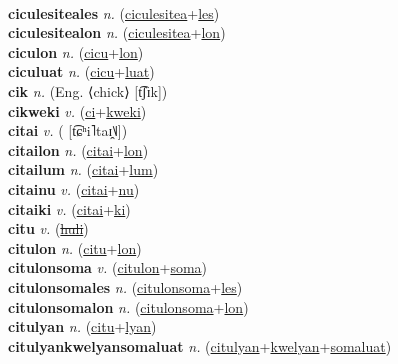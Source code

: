 \label{ciculesitea} \\
\textbf{ciculesiteales} \textit{n.} (\hyperref[ciculesitea]{ciculesitea}+\hyperref[les]{les})
 \label{ciculesiteales} \\
\textbf{ciculesitealon} \textit{n.} (\hyperref[ciculesitea]{ciculesitea}+\hyperref[lon]{lon})
 \label{ciculesitealon} \\
\textbf{ciculon} \textit{n.} (\hyperref[cicu]{cicu}+\hyperref[lon]{lon})
 \label{ciculon} \\
\textbf{ciculuat} \textit{n.} (\hyperref[cicu]{cicu}+\hyperref[luat]{luat})
 \label{ciculuat} \\
\textbf{cik} \textit{n.} (Eng. ⟨chick⟩ [t͡ʃɪk])
 \label{cik} \\
\textbf{cikweki} \textit{v.} (\hyperref[ci]{ci}+\hyperref[kweki]{kweki})
 \label{cikweki} \\
\textbf{citai} \textit{v.} ( [t͡ɕʰi˥taɪ̯˥˩])
 \label{citai} \\
\textbf{citailon} \textit{n.} (\hyperref[citai]{citai}+\hyperref[lon]{lon})
 \label{citailon} \\
\textbf{citailum} \textit{n.} (\hyperref[citai]{citai}+\hyperref[lum]{lum})
 \label{citailum} \\
\textbf{citainu} \textit{v.} (\hyperref[citai]{citai}+\hyperref[nu]{nu})
 \label{citainu} \\
\textbf{citaiki} \textit{v.} (\hyperref[citai]{citai}+\hyperref[ki]{ki})
 \label{citaiki} \\
\textbf{citu} \textit{v.} (\hyperref[huli]{\sout{huli}})
 \label{citu} \\
\textbf{citulon} \textit{n.} (\hyperref[citu]{citu}+\hyperref[lon]{lon})
 \label{citulon} \\
\textbf{citulonsoma} \textit{v.} (\hyperref[citulon]{citulon}+\hyperref[soma]{soma})
 \label{citulonsoma} \\
\textbf{citulonsomales} \textit{n.} (\hyperref[citulonsoma]{citulonsoma}+\hyperref[les]{les})
 \label{citulonsomales} \\
\textbf{citulonsomalon} \textit{n.} (\hyperref[citulonsoma]{citulonsoma}+\hyperref[lon]{lon})
 \label{citulonsomalon} \\
\textbf{citulyan} \textit{n.} (\hyperref[citu]{citu}+\hyperref[lyan]{lyan})
 \label{citulyan} \\
\textbf{citulyankwelyansomaluat} \textit{n.} (\hyperref[citulyan]{citulyan}+\hyperref[kwelyan]{kwelyan}+\hyperref[somaluat]{somaluat})
 \label{citulyankwelyansomaluat} \\

